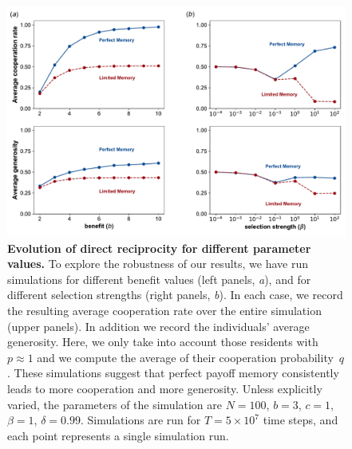 \documentclass[11pt]{article}
\theoremstyle{plainCl1}
\theoremstyle{plainCl2}
\begin{document}
\clearpage
\newpage


\begin{figure}[t]
    \centering
    \includegraphics[width=.75\textwidth]{cooperation_rate_over_b_and_beta.pdf}
    \caption{{\bf Evolution of direct reciprocity for different parameter values.} 
    To explore the robustness of our results, we have run simulations for different benefit values (left panels, {\it a}), and for different selection strengths (right panels, {\it b}). 
    In each case, we record the resulting average cooperation rate over the entire simulation (upper panels). 
    In addition we record the individuals' average generosity. 
    Here, we only take into account those residents with $p\! \approx\! 1$ and we compute
    the average of their cooperation probability~$q$. 
    These simulations suggest that perfect payoff memory consistently leads to more cooperation and more generosity. 
    Unless explicitly varied, the parameters of the simulation are $N\!=\!100$, $b\!=\!3$, $c\!=\!1$, $\beta\!=\!1$, $\delta\!=\!0.99$.
    Simulations are run for $T\!=\!5\times 10^7$ time steps, and each point represents a single simulation run.}
    \label{fig:cooperation_rate_over_benefit_and_beta}
\end{figure}

\clearpage
\newpage
\end{document}
